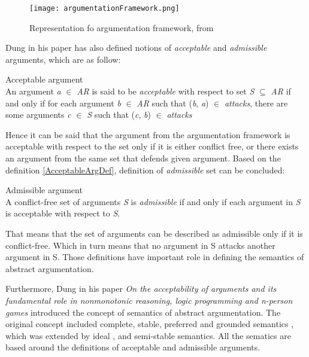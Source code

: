 \begin{figure}[h]
	\centering
	\texttt{[image: argumentationFramework.png]}
	\caption{Representation fo argumentation framework, from \cite{argumentationFrameworkExample}}
	\label{fig:argumentationFrameworkFigure}
\end{figure}
 
Dung in his paper \cite{dung1995} has also defined notions of \textit{acceptable} and \textit{admissible} arguments, which are as follow:

\begin{definition}{Acceptable argument}
\label{AcceptableArgDef}\\
An argument \textit{a} $\in$ \textit{AR} is said to be \textit{acceptable} with respect to set \textit{S} $\subseteq$ \textit{AR} if and only if for each argument \textit{b} $\in$ \textit{AR} such that (\textit{b}, \textit{a}) $\in$ \textit{attacks}, there are some arguments \textit{c} $\in$ \textit{S} such that (\textit{c}, \textit{b}) $\in$ \textit{attacks}
\end{definition}

Hence it can be said that the argument from the argumentation framework is acceptable with respect to the set only if it is either conflict free, or there exists an argument from the same set that defends given argument. Based on the definition \ref{AcceptableArgDef}, definition of \textit{admissible} set can be concluded:

\begin{definition}{Admissible argument}
\label{AdmissibleArgDef}\\
A conflict-free set of arguments \textit{S} is \textit{admissible} if and only if each argument in \textit{S} is acceptable with respect to \textit{S}.
\end{definition}

That means that the set of arguments can be described as admissible only if it is conflict-free. Which in turn means that no argument in S attacks another argument in S. Those definitions have important role in defining the semantics of abstract argumentation.

Furthermore, Dung in his paper \textit{On the acceptability of arguments and its fundamental role in nonmonotonic reasoning, logic programming and n-person games} introduced the concept of semantics of abstract argumentation. The original concept included complete, stable, preferred and grounded semantics \cite{dung1995}, which was extended by ideal \cite{dung2007computing}, and semi-stable \cite{caminada2006semi} semantics. All the sematics are based around the definitions of acceptable and admissible arguments.

